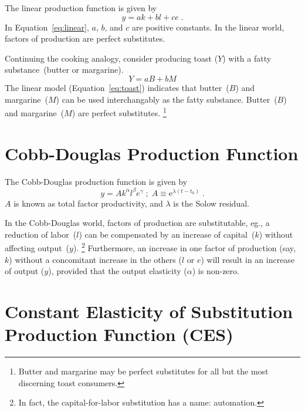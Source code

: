 \documentclass[preprint,authoryear,12pt]{elsarticle}
\begin{document}
The linear production function is given by
%
\begin{equation} \label{eq:linear}
  y = a k + b l + c e \; .
\end{equation}
%
In Equation~\ref{eq:linear}, $a$, $b$, and $c$ are positive constants.
In the linear world, factors of production are perfect substitutes.

Continuing the cooking analogy, consider producing toast ($Y$) 
with a fatty substance~(butter or margarine).
%
\begin{equation} \label{eq:toast}
  Y = a B + b M
\end{equation}
%
The linear model (Equation~\ref{eq:toast}) indicates that butter~($B$) and margarine~($M$) 
can be used interchangably as the fatty substance.
Butter~($B$) and margarine~($M$) are perfect substitutes.%
  \footnote{
  Butter and margarine may be perfect substitutes for all but the most discerning toast consumers.
  }%



\section{Cobb-Douglas Production Function} 
\label{sec:CD}

The Cobb-Douglas production function is given by
%
\begin{equation} \label{eq:CD}
  y = A k^\alpha l^\beta e^\gamma \; ; \; A \equiv \mathrm{e}^{\lambda(t-t_0)} \; .
\end{equation}
%
$A$ is known as total factor productivity,
and $\lambda$ is the Solow residual.

In the Cobb-Douglas world, factors of production are substitutable, 
eg., a reduction of labor~($l$) can be compensated by an increase of capital~($k$)
without affecting output~($y$).%
  \footnote{
  In fact, the capital-for-labor substitution has a name: automation.
  }
Furthermore, an increase in one factor of production (say, $k$)
without a concomitant increase in the others ($l$ or $e$) 
will result in an increase of output ($y$), provided that the output elasticity 
($\alpha$) is non-zero.


\section{Constant Elasticity of Substitution Production Function (CES)} 
\label{sec:CES}
\end{document}
